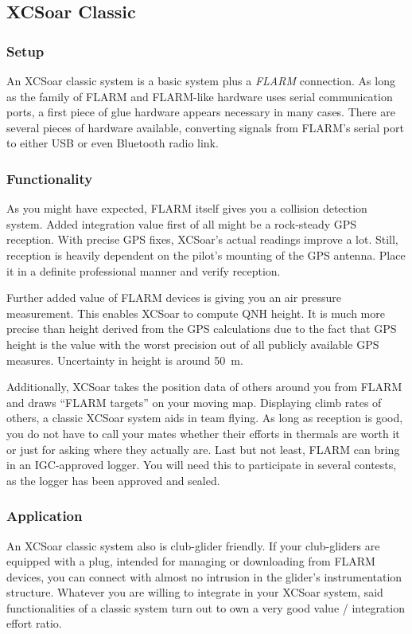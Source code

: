 \subsection*{XCSoar Classic}
\subsubsection*{Setup} An XCSoar classic system is a basic system plus a 
\emph{FLARM} connection. As long as the family of FLARM and FLARM-like hardware
uses serial communication ports, a first piece of glue hardware appears necessary 
in many cases. There are several pieces of hardware available, converting signals 
from FLARM's serial port to either USB or even Bluetooth radio link.

\subsubsection*{Functionality} As you might have expected, FLARM itself gives you
a collision detection system. Added integration value first of all might be a 
rock-steady GPS reception. With precise GPS fixes, XCSoar's actual readings 
improve a lot. Still, reception is heavily dependent on the pilot's mounting of 
the GPS antenna. Place it in a definite professional manner and verify reception.

Further added value of FLARM devices is giving you an air pressure
measurement. This enables XCSoar to compute QNH height. It is much more precise 
than height derived from the GPS calculations due to the fact that GPS height is the
value with the worst precision out of all publicly available GPS measures. 
Uncertainty in height is around 50~m.

Additionally, XCSoar takes the position data of others around you from FLARM and
draws ``FLARM targets'' on your moving map. Displaying climb rates of
others, a classic XCSoar system aids in team flying. As long as reception is 
good, you do not have to call your mates whether their efforts in thermals are 
worth it or just for asking where they actually are. Last but not least, FLARM
can bring in an IGC-approved logger. You will need this to participate in
several contests, as the logger has been approved and sealed.

\subsubsection*{Application} An XCSoar classic system also is club-glider 
friendly. If your club-gliders are equipped with a plug, intended for managing or 
downloading from FLARM devices, you can connect with almost no intrusion in the
glider's instrumentation structure. Whatever you are willing to integrate in your 
XCSoar system, said functionalities of a classic system turn out to own a very 
good value / integration effort ratio.

